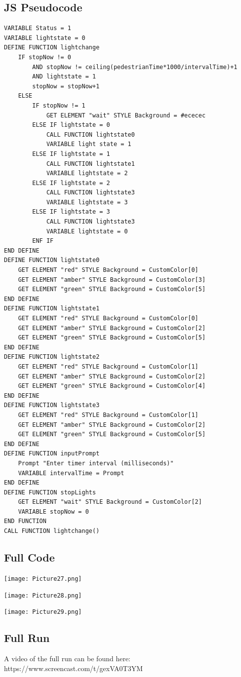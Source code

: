 \documentclass[a4paper]{article}
\begin{document}
\subsection{JS Pseudocode}
\begin{lstlisting}
VARIABLE Status = 1
VARIABLE lightstate = 0
DEFINE FUNCTION lightchange
	IF stopNow != 0 
		AND stopNow != ceiling(pedestrianTime*1000/intervalTime)+1 
		AND lightstate = 1
		stopNow = stopNow+1
	ELSE
		IF stopNow != 1
			GET ELEMENT "wait" STYLE Background = #ececec
		ELSE IF lightstate = 0
			CALL FUNCTION lightstate0
			VARIABLE light state = 1
		ELSE IF lightstate = 1
			CALL FUNCTION lightstate1
			VARIABLE lightstate = 2
		ELSE IF lightstate = 2
			CALL FUNCTION lightstate3
			VARIABLE lightstate = 3
		ELSE IF lightstate = 3
			CALL FUNCTION lightstate3
			VARIABLE lightstate = 0
		ENF IF
END DEFINE
DEFINE FUNCTION lightstate0
	GET ELEMENT "red" STYLE Background = CustomColor[0]
	GET ELEMENT "amber" STYLE Background = CustomColor[3]
	GET ELEMENT "green" STYLE Background = CustomColor[5]
END DEFINE
DEFINE FUNCTION lightstate1
	GET ELEMENT "red" STYLE Background = CustomColor[0]
	GET ELEMENT "amber" STYLE Background = CustomColor[2]
	GET ELEMENT "green" STYLE Background = CustomColor[5]
END DEFINE
DEFINE FUNCTION lightstate2
	GET ELEMENT "red" STYLE Background = CustomColor[1]
	GET ELEMENT "amber" STYLE Background = CustomColor[2]
	GET ELEMENT "green" STYLE Background = CustomColor[4]
END DEFINE
DEFINE FUNCTION lightstate3
	GET ELEMENT "red" STYLE Background = CustomColor[1]
	GET ELEMENT "amber" STYLE Background = CustomColor[2]
	GET ELEMENT "green" STYLE Background = CustomColor[5]
END DEFINE
DEFINE FUNCTION inputPrompt
	Prompt "Enter timer interval (milliseconds)"
	VARIABLE intervalTime = Prompt
END DEFINE
DEFINE FUNCTION stopLights
	GET ELEMENT "wait" STYLE Background = CustomColor[2]
	VARIABLE stopNow = 0
END FUNCTION
CALL FUNCTION lightchange()
\end{lstlisting}
\subsection{Full Code}
\noindent\texttt{[image: Picture27.png]} \par
\noindent\texttt{[image: Picture28.png]} \par
\noindent\texttt{[image: Picture29.png]} \par \newpage
\subsection{Full Run}
A video of the full run can be found here: https://www.screencast.com/t/gexVA0T3YM
\end{document}
